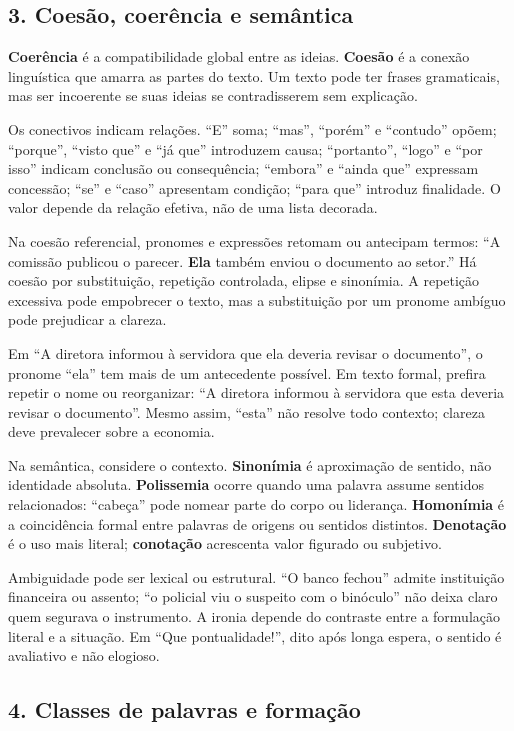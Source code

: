 \documentclass[11pt,a4paper]{article}
\begin{document}
\subsection*{3. Coesão, coerência e semântica}

\textbf{Coerência} é a compatibilidade global entre as ideias. \textbf{Coesão} é a conexão linguística que amarra as partes do texto. Um texto pode ter frases gramaticais, mas ser incoerente se suas ideias se contradisserem sem explicação.

Os conectivos indicam relações. “E” soma; “mas”, “porém” e “contudo” opõem; “porque”, “visto que” e “já que” introduzem causa; “portanto”, “logo” e “por isso” indicam conclusão ou consequência; “embora” e “ainda que” expressam concessão; “se” e “caso” apresentam condição; “para que” introduz finalidade. O valor depende da relação efetiva, não de uma lista decorada.

Na coesão referencial, pronomes e expressões retomam ou antecipam termos: “A comissão publicou o parecer. \textbf{Ela} também enviou o documento ao setor.” Há coesão por substituição, repetição controlada, elipse e sinonímia. A repetição excessiva pode empobrecer o texto, mas a substituição por um pronome ambíguo pode prejudicar a clareza.

Em “A diretora informou à servidora que ela deveria revisar o documento”, o pronome “ela” tem mais de um antecedente possível. Em texto formal, prefira repetir o nome ou reorganizar: “A diretora informou à servidora que esta deveria revisar o documento”. Mesmo assim, “esta” não resolve todo contexto; clareza deve prevalecer sobre a economia.

Na semântica, considere o contexto. \textbf{Sinonímia} é aproximação de sentido, não identidade absoluta. \textbf{Polissemia} ocorre quando uma palavra assume sentidos relacionados: “cabeça” pode nomear parte do corpo ou liderança. \textbf{Homonímia} é a coincidência formal entre palavras de origens ou sentidos distintos. \textbf{Denotação} é o uso mais literal; \textbf{conotação} acrescenta valor figurado ou subjetivo.

Ambiguidade pode ser lexical ou estrutural. “O banco fechou” admite instituição financeira ou assento; “o policial viu o suspeito com o binóculo” não deixa claro quem segurava o instrumento. A ironia depende do contraste entre a formulação literal e a situação. Em “Que pontualidade!”, dito após longa espera, o sentido é avaliativo e não elogioso.

\subsection*{4. Classes de palavras e formação}
\end{document}
